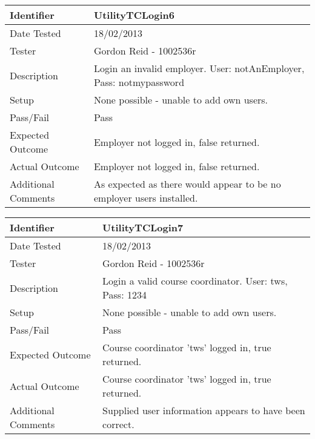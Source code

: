 \documentclass[11pt]{l3deliverable}
\begin{document}
\vspace{2em}

\begin{tabularx}{\textwidth}{|T|L|}
\hline
Identifier & UtilityTCLogin6\\
\hline
Date Tested & 18/02/2013\\
\hline
Tester & Gordon Reid - 1002536r\\
\hline
Description & Login an invalid employer. User: notAnEmployer, Pass: 
notmypassword\\
\hline
Setup & None possible - unable to add own users.\\
\hline
Pass/Fail & Pass\\
\hline
Expected Outcome & Employer not logged in, false returned.\\
\hline
Actual Outcome & Employer not logged in, false returned.\\
\hline
Additional Comments & As expected as there would appear to be no employer users 
installed.\\
\hline
\end{tabularx}

\vspace{2em}

\begin{tabularx}{\textwidth}{|T|L|}
\hline
Identifier & UtilityTCLogin7\\
\hline
Date Tested & 18/02/2013\\
\hline
Tester & Gordon Reid - 1002536r\\
\hline
Description & Login a valid course coordinator. User: tws, Pass: 1234\\
\hline
Setup & None possible - unable to add own users.\\
\hline
Pass/Fail & Pass\\
\hline
Expected Outcome & Course coordinator 'tws' logged in, true returned.\\
\hline
Actual Outcome & Course coordinator 'tws' logged in, true returned.\\
\hline
Additional Comments & Supplied user information appears to have been correct.\\
\hline
\end{tabularx}

\vspace{2em}
\end{document}
